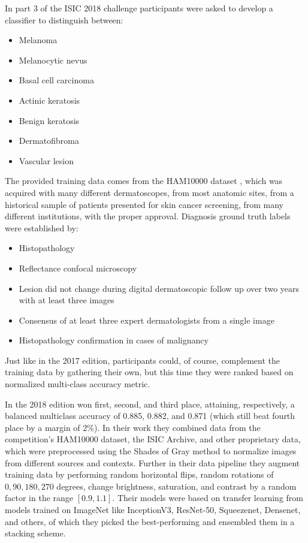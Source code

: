 In part 3 of the \ac{ISIC} 2018 challenge participants were asked to develop a classifier to distinguish between:

\begin{itemize}
    \item Melanoma
    \item Melanocytic nevus
    \item Basal cell carcinoma
    \item Actinic keratosis
    \item Benign keratosis
    \item Dermatofibroma
    \item Vascular lesion
\end{itemize}

The provided training data comes from the \ac{HAM10000} dataset \cite{ham10000}, which was acquired with many different dermatoscopes, from most anatomic sites, from a historical sample of patients presented for skin cancer screening, from many different institutions, with the proper approval. Diagnosis ground truth labels were established by:

\begin{itemize}
    \item Histopathology
    \item Reflectance confocal microscopy
    \item Lesion did not change during digital dermatoscopic follow up over two years with at least three images
    \item Consensus of at least three expert dermatologists from a single image
    \item Histopathology confirmation in cases of malignancy
\end{itemize}

Just like in the 2017 edition, participants could, of course, complement the training data by gathering their own, but this time they were ranked based on normalized multi-class accuracy metric.

In the 2018 edition \citeauthor{isic2018first} \cite{isic2018first} won first, second, and third place, attaining, respectively, a balanced multiclass accuracy of 0.885, 0.882, and 0.871 (which still beat fourth place by a margin of 2\%). In their work they combined data from the competition's \ac{HAM10000} dataset, the \ac{ISIC} Archive, and other proprietary data, which were preprocessed using the Shades of Gray method to normalize images from different sources and contexts. Further in their data pipeline they augment training data by performing random horizontal flips, random rotations of ${0, 90, 180, 270}$ degrees, change brightness, saturation, and contrast by a random factor in the range $[0.9, 1.1]$. Their models were based on transfer learning from models trained on ImageNet like InceptionV3, ResNet-50, Squeezenet, Densenet, and others, of which they picked the best-performing and ensembled them in a stacking scheme.

